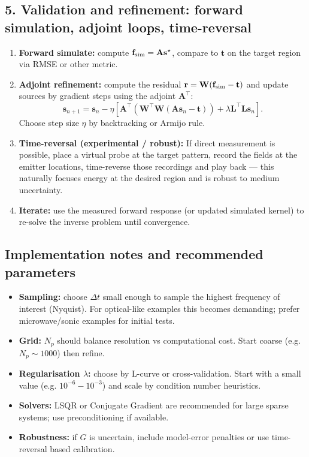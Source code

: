 \documentclass[11pt]{article}
\theoremstyle{plain}
\theoremstyle{definition}
\theoremstyle{remark}
\begin{document}
\subsection*{5. Validation and refinement: forward simulation, adjoint loops, time-reversal}
\begin{enumerate}[leftmargin=*,itemsep=4pt]
  \item \textbf{Forward simulate:} compute $\mathbf{f}_{\rm sim} = \mathbf{A}\mathbf{s}^\star$,
        compare to $\mathbf{t}$ on the target region via RMSE or other metric.
  \item \textbf{Adjoint refinement:} compute the residual $\mathbf{r}=\mathbf{W}(\mathbf{f}_{\rm sim}-\mathbf{t})$
        and update sources by gradient steps using the adjoint $\mathbf{A}^\top$:
        \[
        \mathbf{s}_{n+1} = \mathbf{s}_n - \eta [\mathbf{A}^\top(\mathbf{W}^\top\mathbf{W}(\mathbf{A}\mathbf{s}_n-\mathbf{t}))
        + \lambda \mathbf{L}^\top\mathbf{L}\mathbf{s}_n].
        \]
        Choose step size $\eta$ by backtracking or Armijo rule.
  \item \textbf{Time-reversal (experimental / robust):}
        If direct measurement is possible, place a virtual probe at the target pattern,
        record the fields at the emitter locations, time-reverse those recordings and
        play back — this naturally focuses energy at the desired region and is robust
        to medium uncertainty.
  \item \textbf{Iterate:} use the measured forward response (or updated simulated kernel)
        to re-solve the inverse problem until convergence.
\end{enumerate}

\subsection*{Implementation notes and recommended parameters}
\begin{itemize}[leftmargin=*]
  \item \textbf{Sampling:} choose $\Delta t$ small enough to sample the highest frequency of interest
        (Nyquist). For optical-like examples this becomes demanding; prefer microwave/sonic examples for initial tests.
  \item \textbf{Grid:} $N_p$ should balance resolution vs computational cost. Start coarse (e.g. $N_p\sim 1000$) then refine.
  \item \textbf{Regularisation $\lambda$:} choose by L-curve or cross-validation. Start with a small value (e.g. $10^{-6}\!-\!10^{-3}$) and scale by condition number heuristics.
  \item \textbf{Solvers:} LSQR or Conjugate Gradient are recommended for large sparse systems; use preconditioning if available.
  \item \textbf{Robustness:} if $G$ is uncertain, include model-error penalties or use time-reversal based calibration.
\end{itemize}
\end{document}
